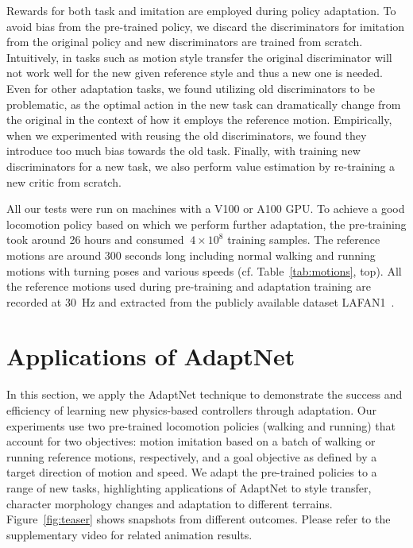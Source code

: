 Rewards for both task and imitation are employed during policy adaptation.  To avoid bias from the pre-trained policy, we discard the discriminators for imitation from the original policy and new discriminators are trained from scratch. 
Intuitively, in tasks such as motion style transfer %
the original discriminator will not work well for the new given reference style and thus a new one is needed. Even for other adaptation tasks, we found utilizing old discriminators to be problematic, as the optimal action in the new task can dramatically change from the original in the context of  how it employs the reference motion.  
Empirically, when we experimented with reusing the old discriminators, we found they introduce too much bias towards the old task. Finally, with training new discriminators for a new task, we also perform value estimation by re-training a new critic from scratch.


All our tests were run on machines with a V100 or A100 GPU.
To achieve a good locomotion policy based on which we perform further adaptation,
the pre-training took around 26 hours and consumed  $~4\times10^8$ training samples. %
The reference motions are around 300 seconds long including normal walking and running motions with turning poses and various speeds (cf. Table~\ref{tab:motions}, top). 
All the reference motions used during pre-training and adaptation training  
are recorded at 30~Hz and extracted from the publicly available dataset LAFAN1~\cite{harvey2020robust}.

\section{Applications of AdaptNet }\label{sec:results}
In this section, we apply the AdaptNet technique to demonstrate the success and efficiency of learning new physics-based controllers through adaptation. 
Our experiments use two pre-trained locomotion policies (walking and running) that account for two objectives: motion imitation based on a batch of walking or running reference motions, respectively, and a goal objective as defined by a target direction of motion and speed. 
We adapt the pre-trained policies to a range of new tasks, highlighting 
applications of AdaptNet to 
style transfer,  
character morphology changes and 
adaptation to different terrains. 
Figure~\ref{fig:teaser} shows snapshots from different outcomes. Please refer to the supplementary video for related animation results. 



